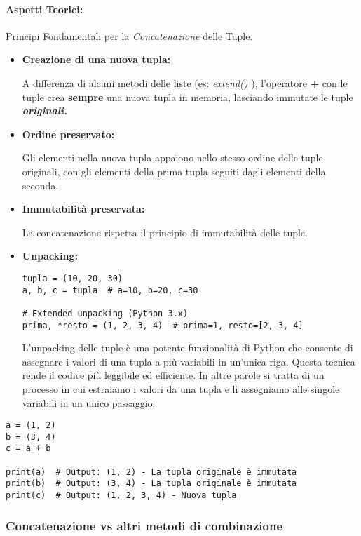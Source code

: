 \paragraph{Aspetti Teorici:}
Principi Fondamentali per la \textit{Concatenazione} delle Tuple.
\begin{itemize}
    \item \textbf{Creazione di una nuova tupla:}

    A differenza di alcuni metodi delle liste (es: \textit{extend()} ), l'operatore \textbf{+} con le tuple crea \textbf{sempre} una nuova tupla in memoria, lasciando immutate le tuple \textbf{\textit{originali.}}
    \item \textbf{Ordine preservato:}

    Gli elementi nella nuova tupla appaiono nello stesso ordine delle tuple originali, con gli elementi della prima tupla seguiti dagli elementi della seconda.

    \item \textbf{Immutabilità preservata:}

    La concatenazione rispetta il principio di immutabilità delle tuple.

    \item \textbf{Unpacking:}
    \begin{lstlisting}
tupla = (10, 20, 30)
a, b, c = tupla  # a=10, b=20, c=30

# Extended unpacking (Python 3.x)
prima, *resto = (1, 2, 3, 4)  # prima=1, resto=[2, 3, 4]
    \end{lstlisting}

L'unpacking delle tuple è una potente funzionalità di Python che consente di assegnare i valori di una tupla a più variabili in un'unica riga. Questa tecnica rende il codice più leggibile ed efficiente. In altre parole si tratta di un processo in cui estraiamo i valori da una tupla e li assegniamo alle singole variabili in un unico passaggio.
\end{itemize}

\begin{lstlisting}
a = (1, 2)
b = (3, 4)
c = a + b

print(a)  # Output: (1, 2) - La tupla originale è immutata
print(b)  # Output: (3, 4) - La tupla originale è immutata
print(c)  # Output: (1, 2, 3, 4) - Nuova tupla
\end{lstlisting}

\subsubsection{{Concatenazione vs altri metodi di combinazione}}\label{ConcatenazionevsOtherMethods}

